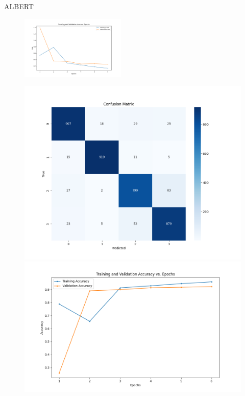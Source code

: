 \documentclass{beamer}
\begin{document}
\begin{frame}{ALBERT}
  \begin{figure}[H]
    \centering
    \includegraphics[width=5cm]{pictures/ALBERT/albert-v2loss_curve.png}
  \end{figure}
  \begin{figure}[htbp]
    \centering
    \begin{minipage}{0.49\linewidth}
      \centering
      \includegraphics[width=0.9\linewidth]{pictures/ALBERT/albert-v2confusion_matrix.png}
    \end{minipage}
    \begin{minipage}{0.49\linewidth}
      \centering
      \includegraphics[width=0.9\linewidth]{pictures/ALBERT/albert-v2accuracy_curve.png}
    \end{minipage}
  \end{figure}
\end{frame}
\end{document}
